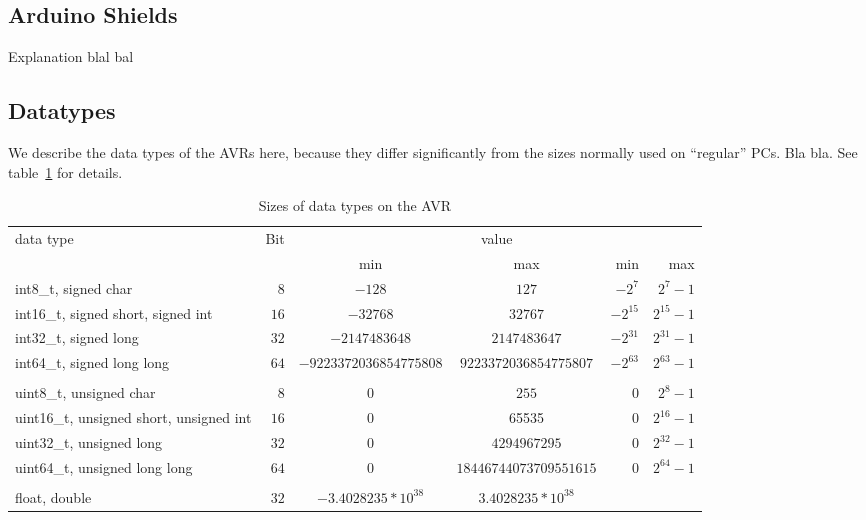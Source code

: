 \documentclass[english, 10pt]{report}
\begin{document}
\subsection{Arduino Shields} \label{sec:shields}
Explanation blal bal

\subsection{Datatypes}
We describe the data types of the AVRs here, because they differ significantly from the sizes normally used on ``regular'' PCs. Bla bla. See
table~\ref{tab:datatypes} for details.

\begin{table}
{\tiny
\begin{center}
\begin{tabular}{|l|r|c|c|r|r|}
\hline
\multirow{2}{*}{data type} & \multirow{2}{*}{Bit} & \multicolumn{4}{|c|}{value}  \\
\cline{3-6}
& & min & max & min & max \\
\hline
int8\_t, signed char				& $8$		& $-128$				& $127$				& $-2^{7}$		& $2^{7}-1$		\\
int16\_t, signed short, signed int		& $16$	& $-32768$				& $32767$				& $-2^{15}$		& $2^{15}-1$	\\
int32\_t, signed long			& $32$ 	& $-2147483648$			& $2147483647$			& $-2^{31}$		& $2^{31}-1$	\\
int64\_t, signed long long			& $64$ 	& $-9223372036854775808$	& $9223372036854775807$	& $-2^{63}$		& $2^{63}-1$	\\
& & & & & \\
uint8\_t, unsigned char			& $8$		& $0$					& $255$				& $0$			& $2^{8}-1$		\\
uint16\_t, unsigned short, unsigned int	& $16$ 	& $0$					& 65535				& $0$ 			& $2^{16}-1$	\\
uint32\_t, unsigned long			& $32$ 	& $0$					& $4294967295$			& $0$			& $2^{32}-1$	\\
uint64\_t, unsigned long long		& $64$ 	& $0$					& $18446744073709551615$	& $0$			& $2^{64}-1$	\\
& & & & & \\
float, double					& $32$ 	& $-3.4028235*10^{38}$		& $3.4028235*10^{38}$		&			&			\\
\hline
\end{tabular}
\end{center}
}
\caption{Sizes of data types on the AVR}
\label{tab:datatypes}
\end{table}
\end{document}
